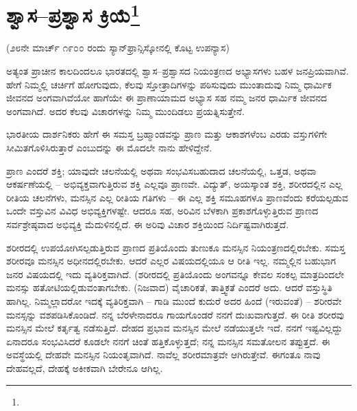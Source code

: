
\chapter[ಶ್ವಾಸ–ಪ್ರಶ್ವಾಸ ಕ್ರಿಯೆ]{ಶ್ವಾಸ–ಪ್ರಶ್ವಾಸ ಕ್ರಿಯೆ\protect\footnote{}}

\begin{center}
(೨೮ನೇ ಮಾರ್ಚ್ ೧೯೦೦ ರಂದು ಸ್ಯಾನ್‌ಫ್ರಾನ್ಸಿಸ್ಕೋನಲ್ಲಿ ಕೊಟ್ಟ ಉಪನ್ಯಾಸ)
\end{center}

\vskip 6pt

ಅತ್ಯಂತ ಪ್ರಾಚೀನ ಕಾಲದಿಂದಲೂ ಭಾರತದಲ್ಲಿ ಶ್ವಾಸ–ಪ್ರಶ್ವಾಸದ ನಿಯಂತ್ರಣದ ಅಭ್ಯಾಸಗಳು ಬಹಳ ಜನಪ್ರಿಯವಾಗಿವೆ. ಹೇಗೆ ನಿಮ್ಮಲ್ಲಿ ಚರ್ಚಿಗೆ ಹೋಗುವುದು, ಕೆಲವು ಸ್ತೋತ್ರಾದಿಗಳನ್ನು ಪಠಿಸುವುದು ಮುಂತಾದುವು ನಿಮ್ಮ ಧಾರ್ಮಿಕ ಜೀವನದ ಅಂಗವಾಗಿವೆಯೋ ಹಾಗೆಯೇ ಈ ಪ್ರಾಣಾಯಾಮದ ಅಭ್ಯಾಸ ಸಹ ನಮ್ಮ ಜನರ ಧಾರ್ಮಿಕ ಜೀವನದ ಅಂಗವಾಗಿದೆ. ಅದರ ಕೆಲವು ವಿಚಾರಗಳನ್ನು ನಿಮ್ಮ ಮುಂದಿಡಲು ಪ್ರಯತ್ನಿಸುತ್ತೇನೆ.

\vskip 6pt

ಭಾರತೀಯ ದಾರ್ಶನಿಕರು ಹೇಗೆ ಈ ಸಮಸ್ತ ಬ್ರಹ್ಮಾಂಡವನ್ನು ಪ್ರಾಣ ಮತ್ತು ಆಕಾಶಗಳೆಂಬ ಎರಡು ವಸ್ತುಗಳಿಗೇ ಸೀಮಿತಗೊಳಿಸಿರುತ್ತಾರೆ ಎಂಬುದನ್ನು ಈ ಮೊದಲೇ ನಾನು ಹೇಳಿದ್ದೇನೆ.

\vskip 6pt

ಪ್ರಾಣ ಎಂದರೆ ಶಕ್ತಿ; ಯಾವುದೇ ಚಲನೆಯಲ್ಲಿ ಅಥವಾ ಸಂಭವಿಸಬಹುದಾದ ಚಲನೆಯಲ್ಲಿ, ಒತ್ತಡ, ಅಥವಾ ಆಕರ್ಷಣೆಯಲ್ಲಿ – ಅಭಿವ್ಯಕ್ತವಾಗುತ್ತಿರುವ ಶಕ್ತಿ ಎಲ್ಲವೂ ಪ್ರಾಣವೇ. ವಿದ್ಯುತ್, ಅಯಸ್ಕಾಂತ ಶಕ್ತಿ, ಶರೀರದಲ್ಲಿನ ಎಲ್ಲ ರೀತಿಯ ಚಲನೆಗಳು, ಮನಸ್ಸಿನ ಎಲ್ಲ ರೀತಿಯ ಗತಿಗಳು – ಈ ಎಲ್ಲ ಶಕ್ತಿ ಸಮೂಹಗಳೂ ಪ್ರಾಣವೆಂದು ಕರೆಯಲ್ಪಡುವ ಒಂದೇ ವಸ್ತುವಿನ ವಿವಿಧ ಅಭಿವ್ಯಕ್ತಿಗಳಷ್ಟೇ. ಆದರೂ ಸಹ, ಅರಿವಿನ ಬೆಳಕಾಗಿ ಪ್ರಕಾಶಗೊಳ್ಳುತ್ತಿರುವ ಪ್ರಾಣದ ಸರ್ವಶ್ರೇಷ್ಠವಾದ ಅಭಿವ್ಯಕ್ತಿ ಮೆದುಳಿನಲ್ಲಿದೆ. ಈ ಅರಿವು ವಿಚಾರ ಶಕ್ತಿಯಿಂದ ನಿರ್ದಿಷ್ಟವಾಗಿರುತ್ತದೆ.

\vskip 6pt

ಶರೀರದಲ್ಲಿ ಉಪಯೋಗಿಸಲ್ಪಡುತ್ತಿರುವ ಪ್ರಾಣದ ಪ್ರತಿಯೊಂದು ತುಣುಕೂ ಮನಸ್ಸಿನ ನಿಯಂತ್ರಣದಲ್ಲಿರಬೇಕು. ಸಮಸ್ತ ಶರೀರವೂ ಮನಸ್ಸಿನ ಅಧೀನದಲ್ಲಿರಬೇಕು. ಆದರೆ ಎಲ್ಲರ ವಿಷಯದಲ್ಲಿಯೂ ಆ ರೀತಿ ಇಲ್ಲ. ನಮ್ಮಲ್ಲಿನ ಬಹುಭಾಗ ಜನರ ವಿಷಯದಲ್ಲಿ ಇದು ವ್ಯತಿರಿಕ್ತವಾಗಿದೆ. (ಶರೀರದಲ್ಲಿ ಪ್ರತಿಯೊಂದು ಅಂಗವನ್ನೂ ಕೇವಲ ಸಂಕಲ್ಪ ಮಾತ್ರದಿಂದಲೇ ಮನಸ್ಸು ಹತೋಟಿಯಲ್ಲಿಡುವಂತಾಗಬೇಕು. (ನಿಜವಾದ) ವೈಚಾರಿಕತೆ, ತಾತ್ತ್ವಿಕತೆ ಎಂದರೆ ಅದು. ಆದರೆ ವಸ್ತುಸ್ಥಿತಿ ಹಾಗಿಲ್ಲ. ನಿಮ್ಮಲ್ಲಾದರೋ ಇದಕ್ಕೆ ವ್ಯತಿರಿಕ್ತವಾಗಿ – ಗಾಡಿ ಮುಂದೆ ಕುದುರೆ ಅದರ ಹಿಂದೆ (ಇರುವಂತೆ) – ಶರೀರವೇ ಮನಸ್ಸನ್ನು ವಶಪಡಿಸಿಕೊಂಡಿದೆ. ನನ್ನ ಬೆರಳೇನಾದರೂ ಗಾಯಗೊಂಡರೆ ನನಗೆ ದುಃಖವಾಗುತ್ತದೆ. ಈ ರೀತಿ ಶರೀರವು ಮನಸ್ಸಿನ ಮೇಲೆ ಕರ್ತೃತ್ವ ನಡೆಸುತ್ತಿದೆ. ದೇಹದ ಪ್ರಭಾವ ಮನಸ್ಸಿನ ಮೇಲೆ ನಡೆಯುತ್ತಲೇ ಇದೆ. ನನಗೆ ಇಷ್ಟವಿಲ್ಲದ್ದು ಏನಾದರೂ ಸಂಭವಿಸಿದರೆ ಕೂಡಲೇ ನನಗೆ ಚಿಂತೆ ಹತ್ತಿಕೊಳ್ಳುತ್ತದೆ; ನನ್ನ ಮನಸ್ಸಿನ ಸಮತೋಲನ ತಪ್ಪುತ್ತದೆ. ಈ ಅವಸ್ಥೆಯಲ್ಲಿ ದೇಹವೇ ಮನಸ್ಸಿನ ನಿಯಂತೃವಾಗಿದೆ. ನಾವೆಲ್ಲ ಶರೀರಮಾತ್ರವೇ ಆಗಿರುತ್ತೇವೆ. ಈಗಂತೂ ನಾವು ದೇಹವಲ್ಲದೆ, ದೇಹಕ್ಕೆ ಅಕೀಕವಾಗಿ ಬೇರೇನೂ ಆಗಿಲ್ಲ.

